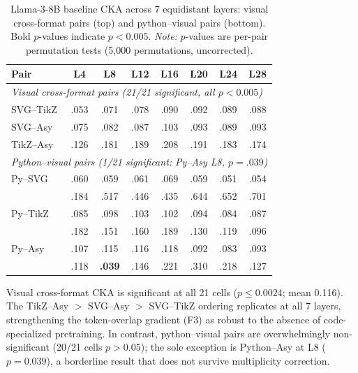 \begin{table}[!ht]
\centering
\small
\caption{Llama-3-8B baseline CKA across 7 equidistant layers: visual cross-format pairs (top) and python--visual pairs (bottom). Bold $p$-values indicate $p < 0.005$. \emph{Note:} $p$-values are per-pair permutation tests (5{,}000 permutations, uncorrected).}
\label{tab:llama_baseline}
\begin{tabular}{lccccccc}
\toprule
Pair & L4 & L8 & L12 & L16 & L20 & L24 & L28 \\
\midrule
\multicolumn{8}{l}{\emph{Visual cross-format pairs (21/21 significant, all $p < 0.005$)}} \\
SVG--TikZ   & .053 & .071 & .078 & .090 & .092 & .089 & .088 \\
SVG--Asy    & .075 & .082 & .087 & .103 & .093 & .089 & .093 \\
TikZ--Asy   & .126 & .181 & .189 & .208 & .191 & .183 & .174 \\
\midrule
\multicolumn{8}{l}{\emph{Python--visual pairs (1/21 significant: Py--Asy L8, $p{=}.039$)}} \\
Py--SVG  & .060 & .059 & .061 & .069 & .059 & .051 & .054 \\
         & \scriptsize{.184} & \scriptsize{.517} & \scriptsize{.446} & \scriptsize{.435} & \scriptsize{.644} & \scriptsize{.652} & \scriptsize{.701} \\
Py--TikZ & .085 & .098 & .103 & .102 & .094 & .084 & .087 \\
         & \scriptsize{.182} & \scriptsize{.151} & \scriptsize{.160} & \scriptsize{.189} & \scriptsize{.130} & \scriptsize{.119} & \scriptsize{.096} \\
Py--Asy  & .107 & .115 & .116 & .118 & .092 & .083 & .093 \\
         & \scriptsize{.118} & \scriptsize{\textbf{.039}} & \scriptsize{.146} & \scriptsize{.221} & \scriptsize{.310} & \scriptsize{.218} & \scriptsize{.127} \\
\bottomrule
\end{tabular}
\end{table}

Visual cross-format CKA is significant at all 21 cells ($p \leq 0.0024$; mean 0.116).
The TikZ--Asy $>$ SVG--Asy $>$ SVG--TikZ ordering replicates at all 7 layers, strengthening the token-overlap gradient (F3) as robust to the absence of code-specialized pretraining.
In contrast, python--visual pairs are overwhelmingly non-significant (20/21 cells $p > 0.05$); the sole exception is Python--Asy at L8 ($p = 0.039$), a borderline result that does not survive multiplicity correction.

